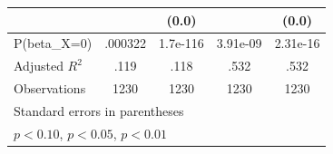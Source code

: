 \begin{table}[htbp]
\begin{tabular}{l*{4}{c}}
                &                  &    (0.0)         &                  &    (0.0)         \\
\hline
P(beta\_X=0)     &  .000322         & 1.7e-116         & 3.91e-09         & 2.31e-16         \\
Adjusted \(R^{2}\)&     .119         &     .118         &     .532         &     .532         \\
Observations    &     1230         &     1230         &     1230         &     1230         \\
\hline\hline
\multicolumn{5}{l}{\footnotesize Standard errors in parentheses}\\
\multicolumn{5}{l}{\footnotesize \sym{*} \(p<0.10\), \sym{**} \(p<0.05\), \sym{***} \(p<0.01\)}\\
\end{tabular}
\end{table}

